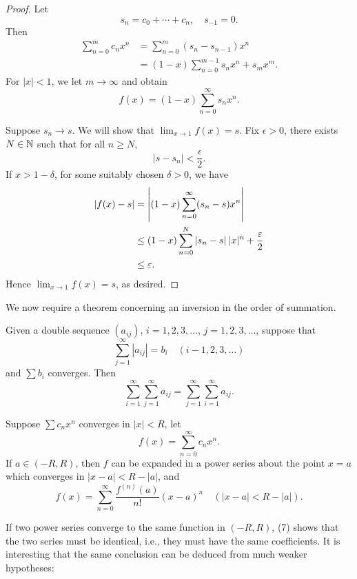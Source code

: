 \begin{proof}
Let
\[s_n=c_0+\cdots+c_n,\quad s_{-1}=0.\]
Then
\begin{align*}
\sum_{n=0}^{m}c_nx^n
&=\sum_{n=0}^{m}(s_n-s_{n-1})x^n\\
&=(1-x)\sum_{n=0}^{m-1}s_nx^n+s_mx^m.
\end{align*}
For $|x|<1$, we let $m\to\infty$ and obtain
\[f(x)=(1-x)\sum_{n=0}^{\infty}s_nx^n.\]

Suppose $s_n\to s$. We will show that $\displaystyle\lim_{x\to1}f(x)=s$. Fix $\epsilon>0$, there exists $N\in\mathbb N$ such that for all $n\ge N$,
\[|s-s_n|<\frac{\epsilon}{2}.\]
If $x>1-\delta$, for some suitably chosen $\delta>0$, we have
\begin{align*}
|f(x)-s|
&=\left|(1-x)\sum_{n=0}^\infty(s_n-s)x^n\right|\\
&\le(1-x)\sum_{n=0}^{N}|s_n-s|\:|x|^n+\frac{\varepsilon}{2}\\
&\le\varepsilon.
\end{align*}
Hence $\displaystyle\lim_{x\to1}f(x)=s$, as desired.
\end{proof}

We now require a theorem concerning an inversion in the order of summation.

\begin{proposition}
Given a double sequence $(a_{ij})$, $i=1,2,3,\dots$, $j=1,2,3,\dots$, suppose that
\[\sum_{j=1}^{\infty}|a_{ij}|=b_i\quad(i-1,2,3,\dots)\]
and $\sum b_i$ converges. Then
\begin{equation}
\sum_{i=1}^{\infty}\sum_{j=1}^{\infty}a_{ij}=\sum_{j=1}^{\infty}\sum_{i=1}^{\infty}a_{ij}.
\end{equation}
\end{proposition}

\begin{theorem}
Suppose $\sum c_nx^n$ converges in $|x|<R$, let
\[f(x)=\sum_{n=0}^{\infty}c_nx^n.\]
If $a\in(-R,R)$, then $f$ can be expanded in a power series about the point $x=a$ which converges in $|x-a|<R-|a|$, and
\begin{equation}
f(x)=\sum_{n=0}^{\infty}\frac{f^{(n)}(a)}{n!}(x-a)^n\quad(|x-a|<R-|a|).
\end{equation}
\end{theorem}

If two power series converge to the same function in $(-R,R)$, (7) shows that the two series must be identical, i.e., they must have the same coefficients. It is interesting that the same conclusion can be deduced from much weaker hypotheses: 

